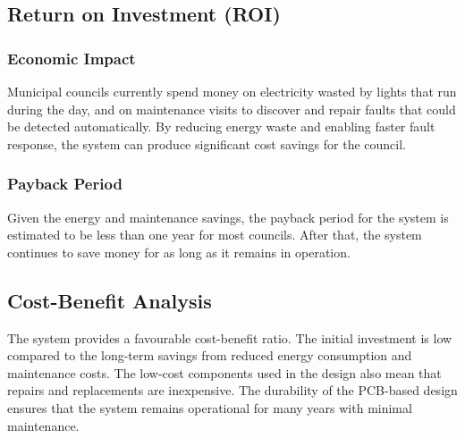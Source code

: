 \subsection{Return on Investment (ROI)}

\subsubsection{Economic Impact}

Municipal councils currently spend money on electricity wasted by lights that run during the day, and on maintenance visits to discover and repair faults that could be detected automatically. By reducing energy waste and enabling faster fault response, the system can produce significant cost savings for the council.

\subsubsection{Payback Period}

Given the energy and maintenance savings, the payback period for the system is estimated to be less than one year for most councils. After that, the system continues to save money for as long as it remains in operation.

\subsection{Cost-Benefit Analysis}

The system provides a favourable cost-benefit ratio. The initial investment is low compared to the long-term savings from reduced energy consumption and maintenance costs. The low-cost components used in the design also mean that repairs and replacements are inexpensive. The durability of the PCB-based design ensures that the system remains operational for many years with minimal maintenance.
